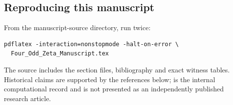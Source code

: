 \subsection{Reproducing this manuscript}
From the manuscript-source directory, run twice:
\begin{verbatim}
pdflatex -interaction=nonstopmode -halt-on-error \
  Four_Odd_Zeta_Manuscript.tex
\end{verbatim}
The source includes the section files, bibliography and exact witness
tables. Historical claims are supported by the references below;
\cite{Project} is the internal computational record and is not presented
as an independently published research article.
